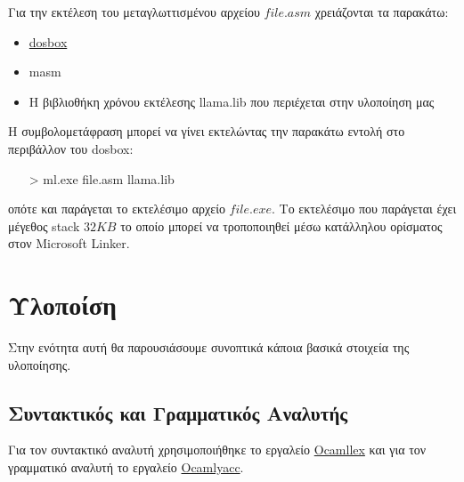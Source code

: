 \documentclass[12pt]{article}
\begin{document}
Για την εκτέλεση του μεταγλωττισμένου αρχείου $file.asm$ χρειάζονται τα παρακάτω:
\begin{itemize}
\item \href{http://www.dosbox.com/}{dosbox}
\item masm
\item Η βιβλιοθήκη χρόνου εκτέλεσης llama.lib που περιέχεται στην υλοποίηση μας
\end{itemize}

Η συμβολομετάφραση μπορεί να γίνει εκτελώντας την παρακάτω εντολή στο περιβάλλον του dosbox:
\begin{itemize}
\item[>] ml.exe file.asm llama.lib
\end{itemize} 
οπότε και παράγεται το εκτελέσιμο αρχείο $file.exe$.
Το εκτελέσιμο που παράγεται έχει μέγεθος stack $32KB$ το οποίο μπορεί να τροποποιηθεί μέσω κατάλληλου ορίσματος στον Microsoft Linker.
%
%
%
%
%
%
%
%
%
%
%    
%    
%
%
%
%
%
%	


\section{Υλοποίση}
Στην ενότητα αυτή θα παρουσιάσουμε συνοπτικά κάποια βασικά στοιχεία της υλοποίησης.
\subsection{Συντακτικός και Γραμματικός Αναλυτής}
Για τον συντακτικό αναλυτή χρησιμοποιήθηκε το εργαλείο \href{http://courses.softlab.ntua.gr/compilers/2012a/ocamlyacc-tutorial.pdf}{Ocamllex} και για τον γραμματικό     αναλυτή το εργαλείο \href{http://courses.softlab.ntua.gr/compilers/2012a/ocamlyacc-tutorial.pdf}{Ocamlyacc}.
\end{document}
